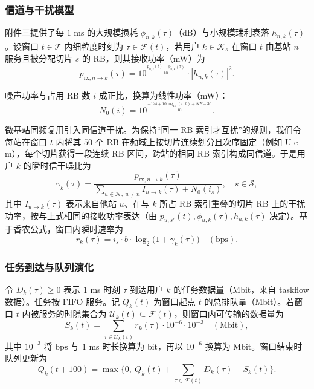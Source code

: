 \subsubsection{信道与干扰模型}

附件三提供了每 $1$ ms 的大规模损耗 $\phi_{n,k}(\tau)$（dB）与小规模瑞利衰落 $h_{n,k}(\tau)$。设窗口 $t\in\mathcal{T}$ 内细粒度时刻为 $\tau\in\mathcal{F}(t)$，若用户 $k\in\mathcal{K}_s$ 在窗口 $t$ 由基站 $n$ 服务且被分配切片 $s$ 的 RB，则其接收功率（mW）为
\begin{equation}
 p_{\mathrm{rx},n\to k}(\tau)=10^{\frac{p_{n,s}(t)-\phi_{n,k}(\tau)}{10}}\cdot |h_{n,k}(\tau)|^2.
\end{equation}

噪声功率与占用 RB 数 $i$ 成正比，换算为线性功率（mW）：
\begin{equation}
 N_0(i)=10^{\frac{-174+10\log_{10}(i\cdot b)+NF-30}{10}}.
\end{equation}

微基站同频复用引入同信道干扰。为保持“同一 RB 索引才互扰”的规则，我们令每站在窗口 $t$ 内将其 $50$ 个 RB 在频域上按切片连续划分且次序固定（例如 U-e-m），每个切片获得一段连续 RB 区间，跨站的相同 RB 索引构成同信道。于是用户 $k$ 的瞬时信干噪比为
\begin{equation}
 \gamma_k(\tau)=\frac{p_{\mathrm{rx},n\to k}(\tau)}{\sum\limits_{u\in\mathcal{N},\ u\neq n} I_{u\to k}(\tau)+N_0(i_s)},\quad s\in\mathcal{S},
\end{equation}
其中 $I_{u\to k}(\tau)$ 表示来自他站 $u$、在与 $k$ 所占 RB 索引重叠的切片 RB 上的干扰功率，按与上式相同的接收功率表达（由 $p_{u,s'}(t),\phi_{u,k}(\tau),h_{u,k}(\tau)$ 决定）。基于香农公式，窗口内瞬时速率为
\begin{equation}
 r_k(\tau)=i_s\cdot b\cdot \log_2\big(1+\gamma_k(\tau)\big)\quad(\mathrm{bps}).
\end{equation}

\subsubsection{任务到达与队列演化}

令 $D_{k}(\tau)\ge 0$ 表示 $1$ ms 时刻 $\tau$ 到达用户 $k$ 的任务数据量（Mbit，来自 taskflow 数据）。任务按 FIFO 服务。记 $Q_k(t)$ 为窗口起点 $t$ 的总排队量（Mbit）。若窗口 $t$ 内被服务的时隙集合为 $\mathcal{U}_k(t)\subseteq\mathcal{F}(t)$，则窗口内可传输的数据量为
\begin{equation}
 S_k(t)=\sum_{\tau\in\mathcal{U}_k(t)} r_k(\tau)\cdot 10^{-6}\cdot 10^{-3}\quad(\mathrm{Mbit}),
\end{equation}
其中 $10^{-3}$ 将 $\mathrm{bps}$ 与 $1$ ms 时长换算为 bit，再以 $10^{-6}$ 换算为 Mbit。窗口结束时队列更新为
\begin{equation}
 Q_k(t+100)=\max\Big\{0,\ Q_k(t)+\sum_{\tau\in\mathcal{F}(t)} D_k(\tau)-S_k(t)\Big\}.
\end{equation}

